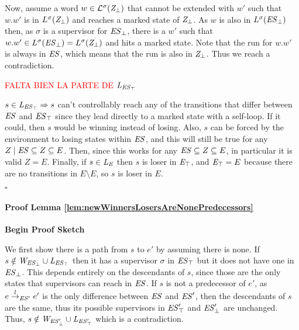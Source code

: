 Now, assume a word $w \in 
\mathcal{L}^\sigma(\mathit{Z_{\bot}})$ that cannot be extended with $w'$ such that $w.w'$ is 
in $L^\sigma(\mathit{Z_{\bot}})$ and reaches a marked state of $\mathit{Z_{\bot}}$. 
As  $w$ is also in $L^\sigma(\mathit{\mathit{ES}_{\bot}})$ then, as
$\sigma$ is a supervisor for $\mathit{\mathit{ES}_{\bot}}$, there is a $w'$ such that 
$w.w' \in L^\sigma(\mathit{\mathit{ES}_{\bot}}) = L^\sigma(\mathit{Z_{\bot}})$ 
and hits a marked state. Note that the run for $w.w'$ is always in $\mathit{ES}$, which means 
that the run is also in $\mathit{Z_{\bot}}$. Thus we reach a contradiction.

\textcolor{red}{FALTA BIEN LA PARTE DE $\mathit{L_{\mathit{\mathit{ES}_{\top}}}}$}

 $s \in \mathit{L_{\mathit{\mathit{ES}_{\top}}}} \Rightarrow s$ can't controllably reach any of the transitions that differ between $\mathit{ES}$ and $\mathit{\mathit{ES}_{\top}}$ since they lead directly to a marked state with a self-loop. If it could, then $s$ would be winning instead of losing. Also, $s$ can be forced by the environment to losing states within $\mathit{ES}$, and this will still be true for any $Z \mid \mathit{ES} \subseteq Z \subseteq E$.
Then, since this works for any $\mathit{ES} \subseteq Z \subseteq E$, in particular it is valid $Z = E$. 
Finally, if $s \in \mathit{L_E}$ then $s$ is loser in $\mathit{E_{\top}}$, and $\mathit{E_{\top}} = E$ because there are no transitions in $E \setminus E$, so $s$ is loser in $E$.
\begin{flushright}
$\square$
\end{flushright}


\paragraph*{Proof Lemma 
\ref{lem:newWinnersLosersAreNonePredecessors}}
\textbf{{Begin Proof Sketch}}

We first show there is a path from $s$ to $e'$ by assuming there is none. If $s \notin 
\mathit{W_{\mathit{\mathit{ES}_{\bot}}}} \cup \mathit{L_{\mathit{\mathit{ES}_{\top}}}}$ then it has a supervisor $\sigma$ in 
$\mathit{\mathit{ES}_{\top}}$ but it does not have one in 
$\mathit{\mathit{ES}_{\bot}}$. This depends entirely on the descendants of 
$s$, since those are the only states that supervisors can reach in $\mathit{ES}$. If $s$ 
is not a predecessor of $e'$, as $e \overset{l}{\rightarrow}_{\mathit{ES}'} e'$ is the only difference 
between $\mathit{ES}$ and $\mathit{ES}'$, then the descendants of $s$ are the same, 
thus its possible supervisors in $\mathit{\mathit{ES}'_{\top}}$ and 
$\mathit{\mathit{ES}'_{\bot}}$ are unchanged. Thus, $s \notin \mathit{W_{\mathit{\mathit{ES}'_{\bot}}}} \cup 
\mathit{L_{\mathit{\mathit{ES}'_{\top}}}}$ which is a contradiction.

